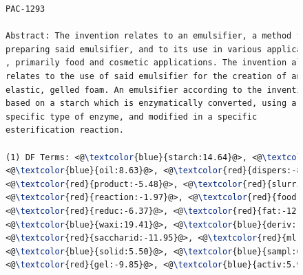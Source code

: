 \begin{figure}[htpb]
\begin{framed}
\vspace*{-2ex}
  \centering
 \begin{lstlisting}[basicstyle=\small\ttfamily , linewidth=\columnwidth,breaklines=true, language=TeX] 
PAC-1293

Abstract: The invention relates to an emulsifier, a method for 
preparing said emulsifier, and to its use in various applications
, primarily food and cosmetic applications. The invention also 
relates to the use of said emulsifier for the creation of an 
elastic, gelled foam. An emulsifier according to the invention is 
based on a starch which is enzymatically converted, using a 
specific type of enzyme, and modified in a specific 
esterification reaction.

(1) DF Terms: <@\textcolor{blue}{starch:14.64}@>, <@\textcolor{blue}{enzym:29.49}@>, <@\textcolor{red}{amylos:-20.15}@>, 
<@\textcolor{blue}{oil:8.63}@>, <@\textcolor{red}{dispers:-8.66}@>, <@\textcolor{red}{ph:-4.55}@>, <@\textcolor{red}{dry:-6.21}@>, <@\textcolor{red}{heat:-2.26}@>, 
<@\textcolor{red}{product:-5.48}@>, <@\textcolor{red}{slurri:-11.48}@>, <@\textcolor{blue}{viscos:7.77}@>, <@\textcolor{red}{composit:-4.49}@>, 
<@\textcolor{red}{reaction:-1.97}@>, <@\textcolor{red}{food:-11.94}@>, <@\textcolor{blue}{agent:5.19}@>, <@\textcolor{red}{debranch:-10.58}@>, 
<@\textcolor{red}{reduc:-6.37}@>, <@\textcolor{red}{fat:-12.83}@>, <@\textcolor{red}{prepar:-0.82}@>, <@\textcolor{red}{hour:-5.42}@>, 
<@\textcolor{blue}{waxi:19.41}@>, <@\textcolor{blue}{deriv:11.97}@>, <@\textcolor{red}{content:-3.38}@>, <@\textcolor{blue}{aqueou:0.38}@>, 
<@\textcolor{red}{saccharid:-11.95}@>, <@\textcolor{red}{ml:-0.79}@>, <@\textcolor{red}{cook:-10.04}@>, <@\textcolor{blue}{modifi:5.65}@>, 
<@\textcolor{blue}{solid:5.50}@>, <@\textcolor{blue}{sampl:6.27}@>, <@\textcolor{blue}{mix:2.48}@>, <@\textcolor{red}{minut:-1.68}@>, <@\textcolor{red}{dri:-0.91}@>, 
<@\textcolor{red}{gel:-9.85}@>, <@\textcolor{blue}{activ:5.98}@>, <@\textcolor{red}{corn:-5.27}@>, <@\textcolor{blue}{alpha:12}@>, <@\textcolor{red}{sprai:-2.74}@> 


\end{lstlisting}
\end{framed}
\end{figure}
